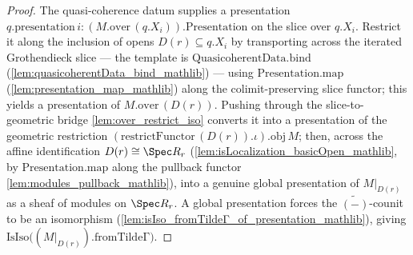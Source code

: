 \begin{proof}
  The quasi-coherence datum supplies a presentation
  \(q.\mathrm{presentation}\,i : (M.\mathrm{over}\,(q.X_i)).\mathrm{Presentation}\) on the slice over
  \(q.X_i\). Restrict it along the inclusion of opens \(D(r) \subseteq q.X_i\) by transporting across
  the iterated Grothendieck slice — the template is \(\mathrm{QuasicoherentData.bind}\)
  (\cref{lem:quasicoherentData_bind_mathlib}) — using \(\mathrm{Presentation.map}\)
  (\cref{lem:presentation_map_mathlib}) along the colimit-preserving slice functor; this yields a
  presentation of \(M.\mathrm{over}\,(D(r))\). Pushing through the slice-to-geometric bridge
  \cref{lem:over_restrict_iso} converts it into a presentation of the geometric restriction
  \((\mathrm{restrictFunctor}\,(D(r)).\iota).\mathrm{obj}\,M\); then, across the affine
  identification \(D(r) \cong \Spec R_r\) (\cref{lem:isLocalization_basicOpen_mathlib}, by
  \(\mathrm{Presentation.map}\) along the pullback functor \cref{lem:modules_pullback_mathlib}), into
  a genuine global presentation of \(M|_{D(r)}\) as a sheaf of modules on \(\Spec R_r\). A global
  presentation forces the \(\widetilde{(-)}\)-counit to be an isomorphism
  (\cref{lem:isIso_fromTildeΓ_of_presentation_mathlib}), giving
  \(\mathrm{IsIso}\bigl((M|_{D(r)}).\mathrm{fromTildeΓ}\bigr)\).
\end{proof}


